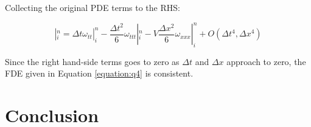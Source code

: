 \documentclass[letterpaper,12pt]{article}
\begin{document}
Collecting the original PDE terms to the RHS:

\begin{equation}
	[\omega_t + V\omega_x - \nu\omega_{xx}]|^n_i = \Delta t \omega_{tt}|^n_i - \frac{\Delta t^2}{6} \omega_{ttt}|^n_i - V\frac{\Delta x^2}{6}\omega_{xxx}|^n_i + O(\Delta t^4,\Delta x^4)
\end{equation}

Since the right hand-side terms goes to zero as $\Delta t$ and $\Delta x$ approach to zero, the FDE given
in Equation \ref{equation:q4} is consistent.

\section{Conclusion}
\end{document}
